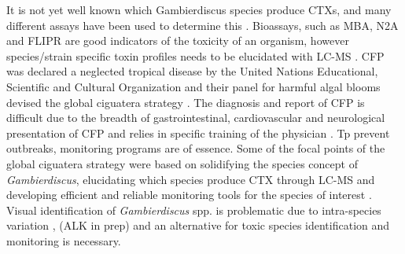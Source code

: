 \documentclass[12pt]{article}
\begin{document}
It is not yet well known which Gambierdiscus species produce CTXs, and many different assays have been used to determine this \citep{globalcig}. Bioassays, such as MBA, N2A and FLIPR are good indicators of the toxicity of an organism, however species/strain specific toxin profiles needs to be elucidated with LC-MS \citep{diogened2014chemistry}.
CFP was declared a neglected tropical disease by the United Nations Educational, Scientific and Cultural Organization and their panel for harmful algal blooms devised the global ciguatera strategy \citep{globalcig}.
The diagnosis and report of CFP is difficult due to the breadth of gastrointestinal, cardiovascular and neurological presentation of CFP and relies in specific training of the physician \citep{sims1987theoretical}. 
Tp prevent outbreaks, monitoring programs are of essence. Some of the focal points of the global ciguatera strategy were based on solidifying the species concept of \emph{Gambierdiscus}, elucidating which species produce CTX through LC-MS and developing efficient and reliable monitoring tools for the species of interest \citep{globalcig}. Visual identification of \emph{Gambierdiscus} spp. is problematic due to intra-species variation \citep{kohli2014high}, (ALK in prep) and an alternative for toxic species identification and monitoring is necessary. \\
\end{document}
